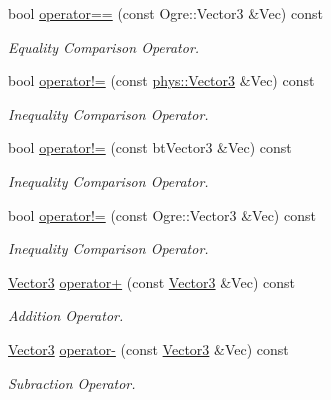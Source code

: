 \begin{DoxyCompactItemize}
bool \hyperlink{classphys_1_1Vector3_aeabe5d949276abe8ea00c8b22b4e652c}{operator==} (const Ogre::Vector3 \&Vec) const 
\begin{DoxyCompactList}\small\item\em Equality Comparison Operator. \item\end{DoxyCompactList}\item 
bool \hyperlink{classphys_1_1Vector3_a9753e8b2540e15f77f724c7882462ce9}{operator!=} (const \hyperlink{classphys_1_1Vector3}{phys::Vector3} \&Vec) const 
\begin{DoxyCompactList}\small\item\em Inequality Comparison Operator. \item\end{DoxyCompactList}\item 
bool \hyperlink{classphys_1_1Vector3_a4c2b4de43118a6fa05288d053f75eb87}{operator!=} (const btVector3 \&Vec) const 
\begin{DoxyCompactList}\small\item\em Inequality Comparison Operator. \item\end{DoxyCompactList}\item 
bool \hyperlink{classphys_1_1Vector3_a8806444791efb7caa9cffc10b4deebef}{operator!=} (const Ogre::Vector3 \&Vec) const 
\begin{DoxyCompactList}\small\item\em Inequality Comparison Operator. \item\end{DoxyCompactList}\item 
\hyperlink{classphys_1_1Vector3}{Vector3} \hyperlink{classphys_1_1Vector3_a982248aea63e87a3163c3b591ab0a225}{operator+} (const \hyperlink{classphys_1_1Vector3}{Vector3} \&Vec) const 
\begin{DoxyCompactList}\small\item\em Addition Operator. \item\end{DoxyCompactList}\item 
\hyperlink{classphys_1_1Vector3}{Vector3} \hyperlink{classphys_1_1Vector3_a8dd6dad4d32d2c7045a31e8fbdc16b8f}{operator-\/} (const \hyperlink{classphys_1_1Vector3}{Vector3} \&Vec) const 
\begin{DoxyCompactList}\small\item\em Subraction Operator. \item\end{DoxyCompactList}\item 

\end{DoxyCompactItemize}
